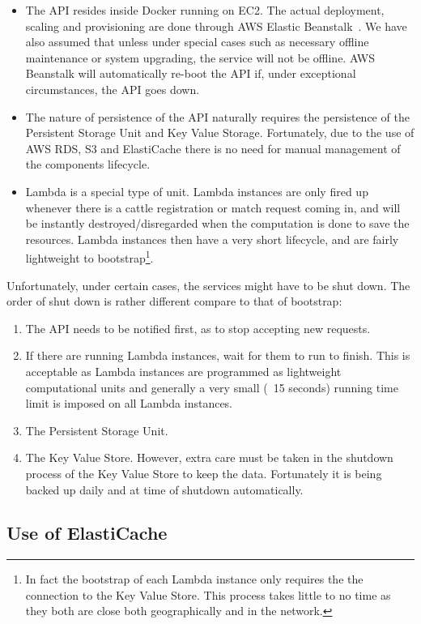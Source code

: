 \begin{itemize}
	\item The API resides inside Docker running on EC2. The actual deployment, scaling and provisioning are done through AWS Elastic Beanstalk~\cite{beanstalk}. We have also assumed that unless under special cases such as necessary offline maintenance or system upgrading, the service will not be offline. AWS Beanstalk will automatically re-boot the API if, under exceptional circumstances, the API goes down.
	\item The nature of persistence of the API naturally requires the persistence of the Persistent Storage Unit and Key Value Storage. Fortunately, due to the use of AWS RDS, S3 and ElastiCache there is no need for manual management of the components lifecycle.
	\item Lambda is a special type of unit. Lambda instances are only fired up whenever there is a cattle registration or match request coming in, and will be instantly destroyed/disregarded when the computation is done to save the resources. Lambda instances then have a very short lifecycle, and are fairly lightweight to bootstrap\footnote{In fact the bootstrap of each Lambda instance only requires the the connection to the Key Value Store. This process takes little to no time as they both are close both geographically and in the network.}.
\end{itemize}

Unfortunately, under certain cases, the services might have to be shut down. The order of shut down is rather different compare to that of bootstrap:

\begin{enumerate}
	\item The API needs to be notified first, as to stop accepting new requests.
	\item If there are running Lambda instances, wait for them to run to finish. This is acceptable as Lambda instances are programmed as lightweight computational units and generally a very small (~15 seconds) running time limit is imposed on all Lambda instances.
	\item The Persistent Storage Unit.
	\item The Key Value Store. However, extra care must be taken in the shutdown process of the Key Value Store to keep the data. Fortunately it is being backed up daily and at time of shutdown automatically.
\end{enumerate}

\subsection{Use of ElastiCache}


